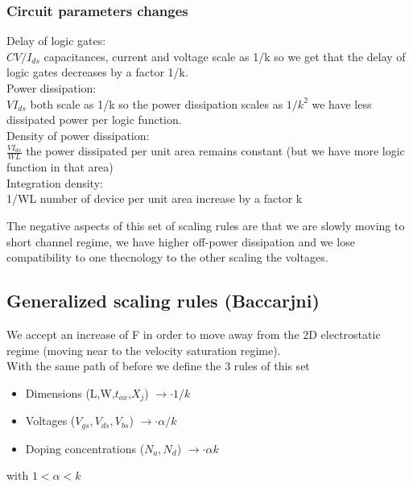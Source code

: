 \subsubsection{Circuit parameters changes}
\tab Delay of logic gates:\\
$CV/I_{ds}$ capacitances, current and voltage scale as 1/k so we get that the delay of logic gates decreases by a factor 1/k.\\
\tab Power dissipation:\\
$VI_{ds}$ both scale as 1/k so the power dissipation scales as $1/k^2$ we have less dissipated power per logic function.\\
\tab Density of power dissipation:\\
$\frac{VI_{ds}}{WL}$ the power dissipated per unit area remains constant (but we have more logic function in that area)\\
\tab Integration density:\\
1/WL number of device per unit area increase by a factor k\\

\vspace{5mm} %

The negative aspects of this set of scaling rules are that we are slowly moving to short channel regime, we have higher off-power dissipation and we lose compatibility to one thecnology to the other scaling the voltages.


\subsection{Generalized scaling rules (Baccarjni)}
We accept an increase of F in order to move away from the 2D electrostatic regime (moving near to the velocity saturation regime).\\
\vspace{5mm}
With the same path of before we define the 3 rules of this set 
\begin{itemize}
  \item Dimensions (L,W,$t_{ox}$,$X_j$)     $\rightarrow \cdot 1/k$
  \item Voltages ($V_{gs},V_{ds},V_{bs}$)   $\rightarrow \cdot \alpha/k$
  \item Doping concentrations ($N_a,N_d$)   $\rightarrow \cdot \alpha k$
\end{itemize}
with $1<\alpha<k$ 


